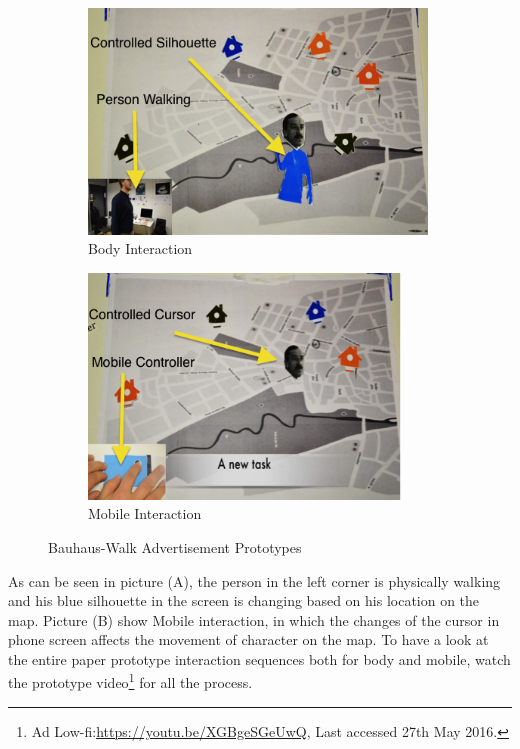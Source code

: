 \begin{figure}[H]
    \centering
    \begin{subfigure}[H]{0.7\textwidth}
        \centering
        \includegraphics[width=\textwidth,height=6cm]{Figures/5/body_interaction}
        \caption{Body Interaction}
        \label{fig:body_inter_}
    \end{subfigure}
    \begin{subfigure}[H]{0.7\textwidth}
        \centering
        \includegraphics[width=\textwidth,height=6cm]{Figures/5/mobile_interactions}
        \caption{Mobile Interaction}
        \label{fig:mobile_inter}
    \end{subfigure}
    \caption{Bauhaus-Walk Advertisement Prototypes}
    \label{fig:Interactive_prototype}
\end{figure}

As can be seen in picture (A), the person in the left corner is physically walking and his blue silhouette in the screen is changing based on his location on the map. Picture (B) show Mobile interaction, in which the changes of the cursor in phone screen affects the movement of character on the map. To have a look at the entire paper prototype interaction sequences both for body and mobile, watch the prototype video\footnote{Ad Low-fi:\url{https://youtu.be/XGBgeSGeUwQ}, Last accessed 27th May 2016. } for all the process. \\



